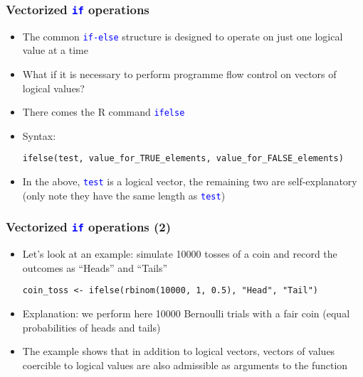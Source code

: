 \documentclass[10pt]{beamer}
\newcommand{\cc}[1]{\texttt{\textcolor{blue}{#1}}}
\theoremstyle{definition}
\begin{document}
\begin{frame}[fragile]
\frametitle{Vectorized \cc{if} operations}
\begin{itemize}
	\item The common \cc{if-else} structure is designed to operate on just one logical value at a time
	\item What if it is necessary to perform programme flow control on vectors of logical values?
	\item There comes the R command \cc{ifelse}
	\item Syntax:
	\begin{lstlisting}[style = rstyle, breaklines]
	ifelse(test, value_for_TRUE_elements, value_for_FALSE_elements)
	\end{lstlisting}
	\item In the above, \cc{test} is a logical vector, the remaining two are self-explanatory (only note they have the same length as \cc{test})
\end{itemize}
\end{frame}

\begin{frame}[fragile]
\frametitle{Vectorized \cc{if} operations (2)}
\begin{itemize}
	\item Let's look at an example: simulate 10000 tosses of a coin and record the outcomes as ``Heads'' and ``Tails''
	\begin{lstlisting}[style = rstyle, breaklines]
	coin_toss <- ifelse(rbinom(10000, 1, 0.5), "Head", "Tail")
	\end{lstlisting}
	\item Explanation: we perform here 10000 Bernoulli trials with a fair coin (equal probabilities of heads and tails)
	\item The example shows that in addition to logical vectors, vectors of values coercible to logical values are also admissible as arguments to the function
\end{itemize}
\end{frame}
\end{document}
